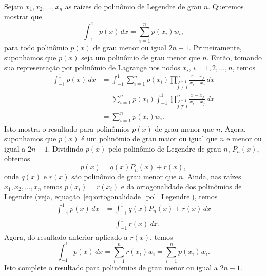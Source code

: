 \begin{dem}
  Sejam $x_1, x_2, \dotsc, x_n$ as raízes do polinômio de Legendre de grau $n$. Queremos mostrar que
  \begin{equation}
    \int_{-1}^1 p(x)\,dx = \sum_{i=1}^n p(x_i)w_i,
  \end{equation}
para todo polinômio $p(x)$ de grau menor ou igual $2n-1$. Primeiramente, suponhamos que $p(x)$ seja um polinômio de grau menor que $n$. Então, tomando sua representação por polinômio de Lagrange nos nodos $x_i$, $i=1, 2, \ldots, n$, temos
\begin{align}
  \int_{-1}^1 p(x)\,dx &= \int_{-1}^1 \sum_{i=1}^n p(x_i)\prod_{\overset{j=1}{j\neq i}}^n \frac{x-x_j}{x_i-x_j}\,dx\\
  &= \sum_{i=1}^n p(x_i) \int_{-1}^1 \prod_{\overset{j=1}{j\neq i}}^n \frac{x-x_j}{x_i-x_j}\,dx\\
  &= \sum_{i=1}^n p(x_i)w_i.
\end{align}
Isto mostra o resultado para polinômios $p(x)$ de grau menor que $n$. Agora, suponhamos que $p(x)$ é um polinômio de grau maior ou igual que $n$ e menor ou igual a $2n-1$. Dividindo $p(x)$ pelo polinômio de Legendre de grau $n$, $P_n(x)$,  obtemos
\begin{equation}
  p(x) = q(x)P_n(x) + r(x),
\end{equation}
onde $q(x)$ e $r(x)$ são polinômio de grau menor que $n$. Ainda, nas raízes $x_1, x_2, \dotsc, x_n$ temos $p(x_i) = r(x_i)$ e da ortogonalidade dos polinômios de Legendre (veja, equação~\eqref{eq:ortogonalidade_pol_Legendre}), temos
\begin{align}
  \int_{-1}^1 p(x)\,dx &= \int_{-1}^1 q(x)P_n(x) + r(x)\,dx\\
  &= \int_{-1}^1 r(x)\,dx.
\end{align}
Agora, do resultado anterior aplicado a $r(x)$, temos
\begin{equation}
  \int_{-1}^1 p(x)\,dx = \sum_{i=1}^n r(x_i)w_i = \sum_{i=1}^n p(x_i)w_i.
\end{equation}
Isto complete o resultado para polinômios de grau menor ou igual a $2n-1$.
\end{dem}

